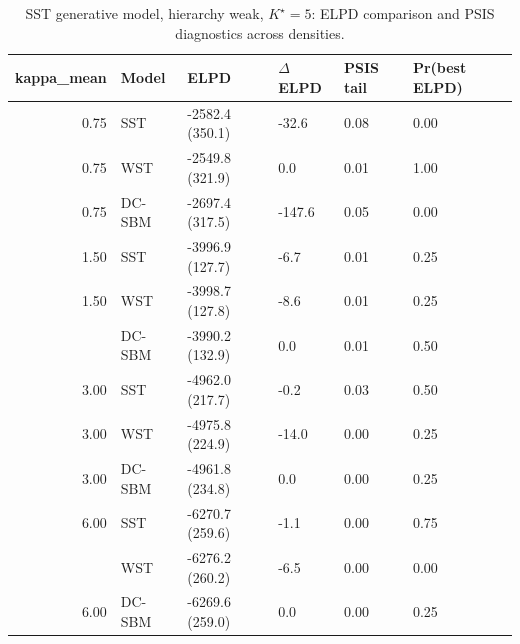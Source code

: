 \begin{table}
\centering
\caption{SST generative model, hierarchy weak, $K^\star=5$: ELPD comparison and PSIS diagnostics across densities.}
\centering
\begin{tabular}[t]{rlllll}
\toprule
kappa_mean & Model & ELPD & $\Delta$ELPD & PSIS tail & Pr(best ELPD)\\
\midrule
0.75 & SST & -2582.4 (350.1) & -32.6 & 0.08 & 0.00\\
0.75 & WST & -2549.8 (321.9) & 0.0 & 0.01 & 1.00\\
0.75 & DC-SBM & -2697.4 (317.5) & -147.6 & 0.05 & 0.00\\
1.50 & SST & -3996.9 (127.7) & -6.7 & 0.01 & 0.25\\
1.50 & WST & -3998.7 (127.8) & -8.6 & 0.01 & 0.25\\
\addlinespace
1.50 & DC-SBM & -3990.2 (132.9) & 0.0 & 0.01 & 0.50\\
3.00 & SST & -4962.0 (217.7) & -0.2 & 0.03 & 0.50\\
3.00 & WST & -4975.8 (224.9) & -14.0 & 0.00 & 0.25\\
3.00 & DC-SBM & -4961.8 (234.8) & 0.0 & 0.00 & 0.25\\
6.00 & SST & -6270.7 (259.6) & -1.1 & 0.00 & 0.75\\
\addlinespace
6.00 & WST & -6276.2 (260.2) & -6.5 & 0.00 & 0.00\\
6.00 & DC-SBM & -6269.6 (259.0) & 0.0 & 0.00 & 0.25\\
\bottomrule
\end{tabular}
\end{table}
